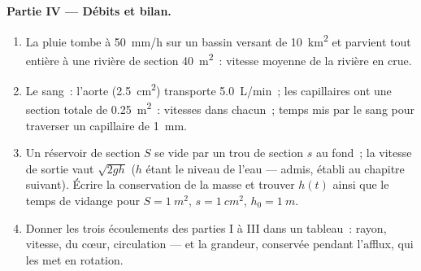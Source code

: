 \begin{problem}
\medskip
\noindent\textbf{Partie IV --- Débits et bilan.}
\begin{enumerate}[resume]
  \item La pluie tombe à \qty{50}{mm/h} sur un bassin versant de \qty{10}{km^2}
        et parvient tout entière à une rivière de section \qty{40}{m^2}~: vitesse
        moyenne de la rivière en crue.
  \item Le sang~: l'aorte (\qty{2.5}{cm^2}) transporte \qty{5.0}{L/min}~; les
        capillaires ont une section totale de \qty{0.25}{m^2}~: vitesses dans
        chacun~; temps mis par le sang pour traverser un capillaire de \qty{1}{mm}.
  \item Un réservoir de section $S$ se vide par un trou de section $s$ au
        fond~; la vitesse de sortie vaut $\sqrt{2gh}$ ($h$ étant le niveau de l'eau
        --- admis, établi au chapitre suivant). Écrire la conservation de la
        masse et trouver $h(t)$ ainsi que le temps de vidange pour
        $S = \qty{1}{m^2}$, $s = \qty{1}{cm^2}$, $h_0 = \qty{1}{m}$.
  \item Donner les trois écoulements des parties I à III dans un tableau~: rayon,
        vitesse,  du cœur, circulation --- et la
        grandeur, conservée pendant l'afflux, qui les met en
        rotation.
\end{enumerate}
\end{problem}
